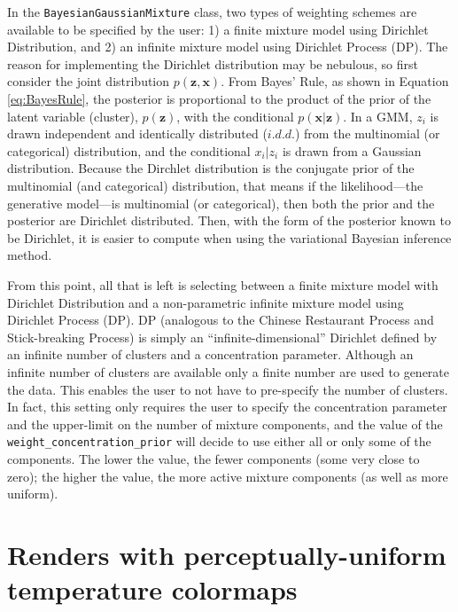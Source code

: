 \documentclass[fleqn,usenatbib,useAMS]{mnras}
\begin{document}
In the \texttt{BayesianGaussianMixture} class, two types of weighting schemes are available to be specified by the user: 1) a finite mixture model using Dirichlet Distribution, and 2) an infinite mixture model using Dirichlet Process (DP). The reason for implementing the Dirichlet distribution may be nebulous, so first consider the joint distribution $p(\textbf{z},\textbf{x})$. From Bayes' Rule, as shown in Equation \ref{eq:BayesRule}, the posterior is proportional to the product of the prior of the latent variable (cluster), $p(\textbf{z})$, with the conditional $p(\textbf{x}|\textbf{z})$. In a GMM, $z_i$ is drawn independent and identically distributed ($i.d.d.$) from the multinomial (or categorical) distribution, and the conditional $x_i|z_i$ is drawn from a Gaussian distribution. Because 
the Dirchlet distribution is the conjugate prior of the multinomial (and categorical) distribution, that means if the likelihood---the generative model---is multinomial (or categorical), then both the prior and the posterior are Dirichlet distributed. Then, with the form of the posterior known to be Dirichlet, it is easier to compute when using the variational Bayesian inference method. \par

From this point, all that is left is selecting between a finite mixture model with Dirichlet Distribution and a non-parametric infinite mixture model using Dirichlet Process (DP). DP (analogous to the Chinese Restaurant Process and Stick-breaking Process) is simply an ``infinite-dimensional'' Dirichlet defined by an infinite number of clusters and a concentration parameter. Although an infinite number of clusters are available only a finite number are used to generate the data. This enables the user to not have to pre-specify the number of clusters. In fact, this setting only requires the user to specify the concentration parameter and the upper-limit on the number of mixture components, and the value of the \texttt{weight\_concentration\_prior} will decide to use either all or only some of the components. The lower the value, the fewer components (some very close to zero); the higher the value, the more active mixture components (as well as more uniform). \par



\section{Renders with perceptually-uniform temperature colormaps}\label{subsec:nonu}
\end{document}
